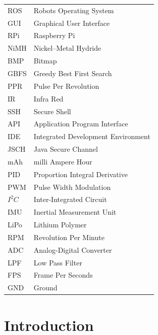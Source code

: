 \documentclass[12pt]{book}
\begin{document}
\begin{tabular}{  l    l   }
	ROS & Robots Operating System	\\
	GUI & Graphical User Interface	\\
	RPi &   Raspberry Pi	\\
	NiMH & Nickel–Metal Hydride\\
	BMP & Bitmap \\
	GBFS & Greedy Best First Search\\
	PPR & Pulse Per Revolution \\
	IR & Infra Red \\
	SSH & Secure Shell\\
	API & Application Program Interface\\
	IDE & Integrated Development Environment\\
	JSCH & Java Secure Channel\\
	mAh & milli Ampere Hour \\
	PID & Proportion Integral Derivative  \\  
	PWM &  Pulse Width Modulation  \\   
	$I^2C$  & Inter-Integrated Circuit   \\  
	IMU &  Inertial Measurement Unit \\  
	LiPo &   Lithium Polymer\\ 
	RPM   & Revolution Per Minute  \\
	ADC   & Analog-Digital Converter   \\  
	LPF & Low Pass Filter \\
	FPS & Frame Per Seconds\\
	GND & Ground
	
\end{tabular} 





\listoffigures

\setcounter{page}{1}

\chapter{Introduction}
\end{document}
